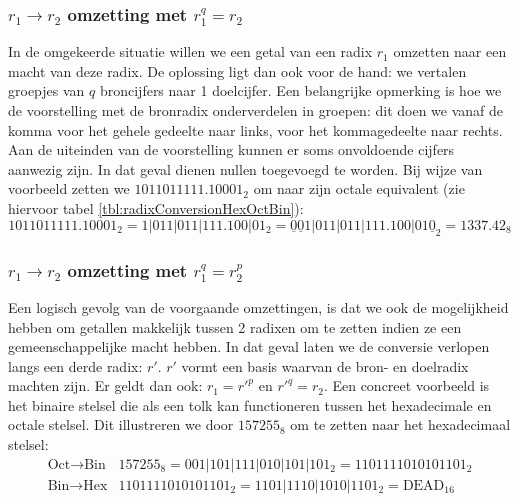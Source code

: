 \subsubsection{$r_1\rightarrow r_2$ omzetting met $r_1^q=r_2$}
In de omgekeerde situatie willen we een getal van een radix $r_1$ omzetten naar een macht van deze radix. De oplossing ligt dan ook voor de hand: we vertalen groepjes van $q$ broncijfers naar 1 doelcijfer. Een belangrijke opmerking is hoe we de voorstelling met de bronradix onderverdelen in groepen: dit doen we vanaf de komma voor het gehele gedeelte naar links, voor het kommagedeelte naar rechts. Aan de uiteinden van de voorstelling kunnen er soms onvoldoende cijfers aanwezig zijn. In dat geval dienen nullen toegevoegd te worden. Bij wijze van voorbeeld zetten we $1011011111.10001_2$ om naar zijn octale equivalent (zie hiervoor tabel \ref{tbl:radixConversionHexOctBin}):
\begin{equation}
1011011111.10001_2=1|011|011|111.100|01_2=\underline0\underline01|011|011|111.100|01\underline0_2=1337.42_8
\end{equation}
\subsubsection{$r_1\rightarrow r_2$ omzetting met $r_1^q=r_2^p$}
Een logisch gevolg van de voorgaande omzettingen, is dat we ook de mogelijkheid hebben om getallen makkelijk tussen 2 radixen om te zetten indien ze een gemeenschappelijke macht hebben. In dat geval laten we de conversie verlopen langs een derde radix: $r'$. $r'$ vormt een basis waarvan de bron- en doelradix machten zijn. Er geldt dan ook: $r_1=r'^p$ en $r'^q=r_2$. Een concreet voorbeeld is het binaire stelsel die als een tolk kan functioneren tussen het hexadecimale en octale stelsel. Dit illustreren we door $157255_8$ om te zetten naar het hexadecimaal stelsel:
\begin{equation}
\begin{array}{ll}
\mbox{Oct$\rightarrow$Bin}&157255_8=001|101|111|010|101|101_2=1101111010101101_2\\
\mbox{Bin$\rightarrow$Hex}&1101111010101101_2=1101|1110|1010|1101_2=\mbox{DEAD}_{16}
\end{array}
\end{equation}
